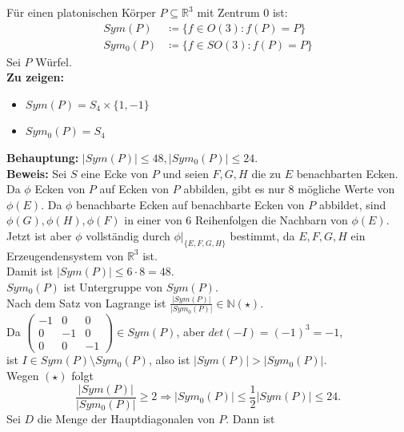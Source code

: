 \begin{problem*}[3]

Für einen platonischen Körper $ P \subseteq \mathbb{R}^3 $ mit Zentrum $ 0 $ ist:
\begin{align*}
   Sym(P) &\coloneqq \{ f \in O(3) : f(P) = P \} \\
   Sym_0(P) &\coloneqq \{ f \in SO(3) : f(P) = P \}
 \end{align*} 
Sei $ P $ Würfel.\\
\textbf{Zu zeigen:} 
\begin{itemize}
  \item $Sym(P) = S_4 \times \{ 1, -1 \}$
  \item $Sym_0(P) = S_4$
\end{itemize}
\textbf{Behauptung:} 
$\vert Sym(P) \vert \leq 48, \vert Sym_0(P) \vert \leq 24$.\\
\textbf{Beweis:} Sei $ S $ eine Ecke von $ P $ und seien $ F,G,H $ die zu $ E $ benachbarten Ecken. Da $\phi$ Ecken von $ P $ auf Ecken von $ P $ abbilden, gibt es nur 8 mögliche Werte von $\phi(E)$. Da $ \phi $ benachbarte Ecken auf benachbarte Ecken von $ P $ abbildet, sind $\phi(G), \phi(H), \phi(F)$ in einer von 6 Reihenfolgen die Nachbarn von $ \phi(E) $. Jetzt ist aber $ \phi $ vollständig durch $\phi|_{\{ E,F,G,H \}}$ bestimmt, da $ E,F,G,H $ ein Erzeugendensystem von $\mathbb{R}^3$ ist.\\
Damit ist $ \vert Sym(P) \vert \leq 6 \cdot 8 = 48$. \\
$Sym_0(P) $ ist Untergruppe von $ Sym(P) $. \\
Nach dem Satz von Lagrange ist $\frac{\vert Sym(P) \vert}{\vert Sym_0(P) \vert} \in \mathbb{N} (\star)$.\\
Da $\begin{pmatrix}
	-1 & 0 & 0 \\
	0 & -1 & 0 \\
	0 & 0 & -1 
\end{pmatrix} \in Sym(P)$, aber $det(-I) = (-1)^3 = -1$,\\
ist $I \in Sym(P) \setminus Sym_0(P)$, also ist $\vert Sym(P) \vert > \vert Sym_0(P) \vert $.\\
Wegen $ (\star) $ folgt
\begin{equation*}
	\frac{\vert Sym(P) \vert}{\vert Sym_0(P) \vert} \geq 2 \Rightarrow \vert Sym_0(P) \vert \leq \frac{1}{2} \vert Sym(P) \vert \leq 24.
\end{equation*}
Sei $ D $ die Menge der Hauptdiagonalen von $ P $. Dann ist 
\begin{equation*}

\end{equation*}
\end{problem*}
